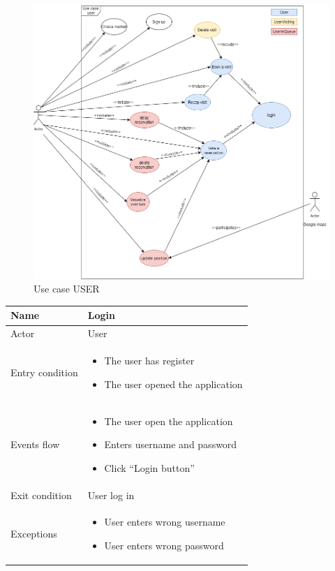 \begin{figure}[h]
	\caption{Use case USER}
	\label{fig:UML2}
	
	\centering
	\includegraphics[width=1\textwidth, height=1\textwidth]{diagrams/UseCaseUser.png}
	
\end{figure}



\begin{tabular}{|p{5cm} | p{7cm} | }
\hline
Name & Login \\
\hline
Actor & User \\
\hline
Entry condition &
\begin{itemize}
\item The user has register
\item The user opened the application
\end{itemize} \\
\hline
Events flow & 
\begin{itemize}
	\item The user open the application
	\item Enters username and password
	\item Click “Login button”
\end{itemize} \\
\hline
Exit condition & User log in \\
\hline 
Exceptions &
\begin{itemize}
	\item User enters wrong username
	\item User enters wrong password
\end{itemize} \\
\hline
\end{tabular}

